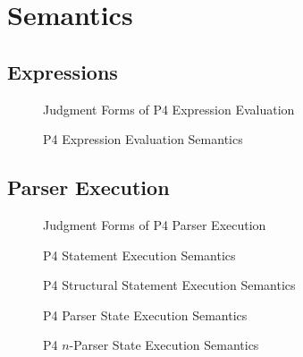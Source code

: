 \documentclass[UTF8]{article}
\begin{document}
\section{Semantics}
\subsection{Expressions}
\begin{figure}[h!]
\centering\ottgrammartabular{
\ottpFourXXparserXXexpXXred\ottafterlastrule
}
\caption{Judgment Forms of P4 Expression Evaluation}
\label{fig:judgexp}
\end{figure}

\begin{figure}[h!]
\centering\ottdefnspFourXXparserXXexpXXred
\caption{P4 Expression Evaluation Semantics}
\label{fig:semexp}
\end{figure}

\newpage
\subsection{Parser Execution}
\begin{figure}[h!]
\centering\ottgrammartabular{
\ottpFourXXparserXXbstmtXXred\ottinterrule
\ottpFourXXparserXXblockXXred\ottinterrule
\ottpFourXXparserXXnblockXXred\ottafterlastrule
}
\caption{Judgment Forms of P4 Parser Execution}
\label{fig:judgexec}
\end{figure}

\begin{figure}[h!]
\ottdefnspFourXXparserXXbstmtXXred
\caption{P4 Statement Execution Semantics}
\label{fig:semstmtexec}
\end{figure}

\begin{figure}[h!]
\ottdefnspFourXXparserXXstrXXstmtXXred
\caption{P4 Structural Statement Execution Semantics}
\label{fig:semstmtexec}
\end{figure}

\begin{figure}[h!]
\ottdefnspFourXXparserXXblockXXred
\caption{P4 Parser State Execution Semantics}
\label{fig:semblockexec}
\end{figure}

\begin{figure}[h!]
\ottdefnspFourXXparserXXnblockXXred
\caption{P4 $n$-Parser State Execution Semantics}
\label{fig:semnblockexec}
\end{figure}

\printbibliography
\end{document}
